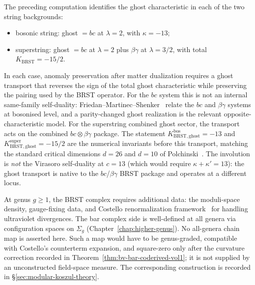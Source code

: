 \begin{remark}
\label{rem:ghost-superghost-koszul}
The preceding computation identifies the ghost characteristic in
each of the two string backgrounds:
\begin{itemize}[nosep]
\item bosonic string: ghost $= bc$ at $\lambda = 2$, with
 $\kappa = -13$;
\item superstring: ghost $= bc$ at $\lambda = 2$ plus $\beta\gamma$
 at $\lambda = 3/2$, with total
 $K_{\mathrm{BRST}}=-15/2$.
\end{itemize}
In each case, anomaly preservation after matter dualization requires
a ghost transport that reverses the sign of the total ghost
characteristic while preserving the pairing used by the BRST
operator. For the $bc$ system this is not an internal same-family
self-duality: Friedan--Martinec--Shenker~\cite{FMS86} relate the
$bc$ and $\beta\gamma$ systems at bosonised level, and a parity-changed
ghost realization is the relevant opposite-characteristic model. For
the superstring combined ghost sector, the transport acts on the
combined $bc\otimes\beta\gamma$ package. The statement
$K_{\mathrm{BRST,ghost}}^{\mathrm{bos}} = -13$ and
$K_{\mathrm{BRST,ghost}}^{\mathrm{super}} = -15/2$ are the
numerical invariants before this transport, matching the standard
critical dimensions $d = 26$ and $d = 10$ of
Polchinski~\cite{Polchinski1998}. The involution is
\emph{not} the Virasoro self-duality at $c = 13$
\textup{(}which would require $\kappa + \kappa' = 13$\textup{)}:
the ghost transport is native to the $bc$\slash$\beta\gamma$ BRST
package and operates at a different locus.
\end{remark}

\begin{remark}
\label{rem:brst-bar-higher-genus}
At genus $g \geq 1$, the BRST complex requires additional data:
the moduli-space density, gauge-fixing data, and
Costello renormalization framework~\cite{costello-renormalization} for
handling ultraviolet divergences. The bar complex side is well-defined
at all genera via configuration spaces on $\Sigma_g$
(Chapter~\ref{chap:higher-genus}). No all-genera chain map is
asserted here. Such a map would have to be genus-graded, compatible
with Costello's counterterm expansion, and square-zero only after the
curvature correction recorded in Theorem~\ref{thm:bv-bar-coderived-vol1};
it is not supplied by an unconstructed field-space measure.
The corresponding construction is recorded in
\S\ref{sec:modular-koszul-theory}.
\end{remark}

